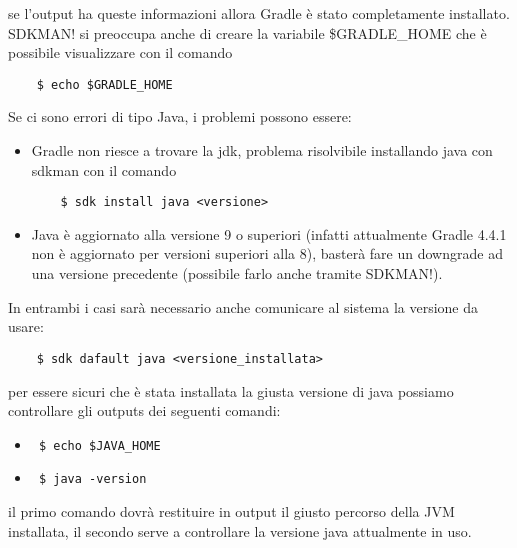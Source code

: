 se l'output ha queste informazioni allora Gradle è stato completamente installato. SDKMAN! si preoccupa anche di creare la variabile \$GRADLE\_HOME che è possibile visualizzare con il comando 
\begin{verbatim} 
    $ echo $GRADLE_HOME \end{verbatim} 
Se ci sono errori di tipo Java, i problemi possono essere:
\begin{itemize}
  \item Gradle non riesce a trovare la jdk, problema risolvibile installando java con sdkman con il comando 
  \begin{verbatim}
    $ sdk install java <versione>  \end{verbatim}
  \item Java è aggiornato alla versione 9 o superiori (infatti attualmente Gradle 4.4.1 non è aggiornato per versioni superiori alla 8), basterà fare un downgrade ad una versione precedente (possibile farlo anche tramite SDKMAN!).
\end{itemize}
In entrambi i casi sarà necessario anche comunicare al sistema la versione da usare: 
\begin{verbatim}  
    $ sdk dafault java <versione_installata> \end{verbatim} 
per essere sicuri che è stata installata la giusta versione di java possiamo controllare gli outputs dei seguenti comandi:
\begin{itemize}
  \item \begin{verbatim} $ echo $JAVA_HOME \end{verbatim}
  \item \begin{verbatim} $ java -version \end{verbatim}
\end{itemize}
il primo comando dovrà restituire in output il giusto percorso della JVM installata, il secondo serve a controllare la versione java attualmente in uso.

